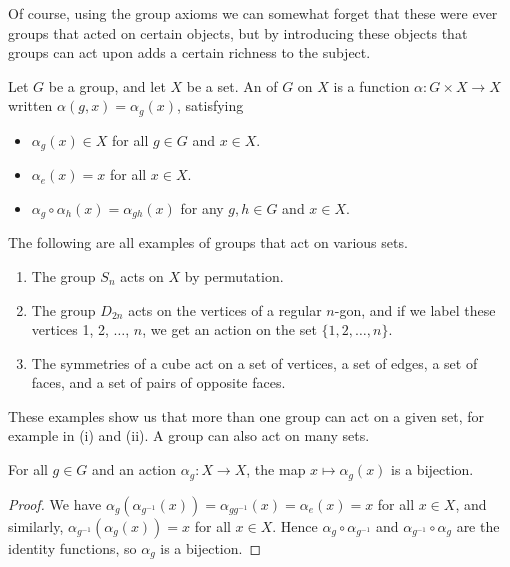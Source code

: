 \documentclass[a4]{scrreprt}
\begin{document}
Of course, using the group axioms we can somewhat forget that these were ever groups that acted on certain objects, but by introducing these objects that groups can act upon adds a certain richness to the subject.

\begin{definition}
Let $G$ be a group, and let $X$ be a set. An  of $G$ on $X$ is a function $\alpha : G \times X \rightarrow X$ written $\alpha(g, x) = \alpha_g(x)$, satisfying
\begin{itemize}
	\item $\alpha_g(x) \in X$ for all $g \in G$ and $x \in X$.
	\item $\alpha_e(x) = x$ for all $x \in X$.
	\item $\alpha_g \circ \alpha_h (x) = \alpha_{gh}(x)$ for any $g, h \in G$ and $x \in X$.
\end{itemize}
\end{definition}

\begin{example}
The following are all examples of groups that act on various sets.
\begin{enumerate}[label=(\roman*)]
	\item The group $S_n$ acts on $X$ by permutation.
	\item The group $D_{2n}$ acts on the vertices of a regular $n$-gon, and if we label these vertices 1, 2, $\dots$, $n$, we get an action on the set $\{1, 2, \dots, n\}$.
	\item The symmetries of a cube act on a set of vertices, a set of edges, a set of faces, and a set of pairs of opposite faces.
\end{enumerate}
\end{example}

\begin{remark}
	These examples show us that more than one group can act on a given set, for example in (i) and (ii). A group can also act on many sets.
\end{remark}

\begin{lemma}\label{lemma:bijection}
	For all $g \in G$ and an action $\alpha_g: X \rightarrow X$, the map $x \mapsto \alpha_g(x)$ is a bijection.
\end{lemma}
\begin{proof}
	We have $\alpha_g(\alpha_{g^{-1}}(x)) = \alpha_{g g^{-1}}(x) = \alpha_e(x) = x$ for all $x \in X$, and similarly, $\alpha_{g^{-1}}(\alpha_g(x)) = x$ for all $x \in X$. Hence $\alpha_g \circ \alpha_{g^{-1}}$ and $\alpha_{g^{-1}} \circ \alpha_{g}$ are the identity functions, so $\alpha_g$ is a bijection.
\end{proof}
\end{document}
